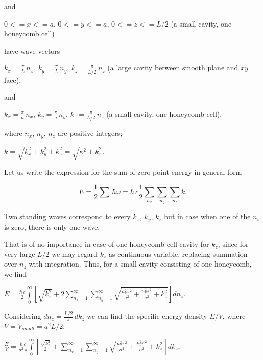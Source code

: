 \documentclass[twoside, 10pt, ptm]{article}
\begin{document}
\begin{multicols}{2}
    and

    \(0<=x<=a\), \(0<=y<=a\), \(0<=z<=L/2\) (a small cavity, one honeycomb
cell)

    have wave vectors

    \(k_x = \frac{\pi}{L}\,n_x\), \(k_y = \frac{\pi}{L}\,n_y\),
\(k_z = \frac{\pi}{L/2}\,n_z\) (a large cavity between smooth plane and
\(xy\) face),

    and

    \(k_x = \frac{\pi}{a}\,n_x\), \(k_y = \frac{\pi}{a}\,n_y\),
\(k_z = \frac{\pi}{L/2}\,n_z\) (a small cavity, one honeycomb cell),

where \(n_x\), \(n_y\), \(n_z\) are positive integers;

    \(k = \sqrt{k_x^2+k_y^2+k_z^2} = \sqrt{\kappa^2+k_z^2}\).

Let us write the expression for the sum of zero-point energy in general form

\begin{equation} \label{eq:1}
E = \frac{1}{2}\sum\,\hbar\omega = \hbar\,c\frac{1}{2}\sum\limits_{n_x}^{}\sum\limits_{n_y}^{}\sum\limits_{n_z}^{}k.
\end{equation}

    Two standing waves correspond to every \(k_x\), \(k_y\), \(k_z\) but in case when
one of the \(n_i\) is zero, there is only one wave.

    That is of no importance in case of one honeycomb cell cavity for \(k_z\),
since for very large \(L/2\) we may regard \(k_z\) as
continuous variable, replacing summation over \(n_z\) with integration.
Thus, for a small cavity consisting of one honeycomb, we find

\noindent
\(E = \frac{\hbar\,c}{2}\int\limits_{0}^{\infty}\left[{\sqrt{k_z^2}+2\sum\limits_{n_x=1}^{\infty}\sum\limits_{n_y=1}^{\infty}\sqrt{\frac{n_x^2 \pi^2}{a^2}+\frac{n_y^2 \pi^2}{a^2}+k_z^2}}\right]d{n_z}\).

   Considering \(dn_z = \frac{L/2}{\pi}\,dk_z\) we can find the specific energy density \(E/V\), where
\(V = V_{small} = a^2 L/2\):


\noindent
\(\frac{E}{V} = \frac{\hbar\,c}{a^2\,\pi}\int\limits_{0}^{\infty}\left[{\frac{\sqrt{k_z^2}}{2}+\sum\limits_{n_x=1}^{\infty}\sum\limits_{n_y=1}^{\infty}\sqrt{\frac{n_x^2 \pi^2}{a^2}+\frac{n_y^2 \pi^2}{a^2}+k_z^2}}\right] dk_z\),


\end{multicols}
\end{document}
